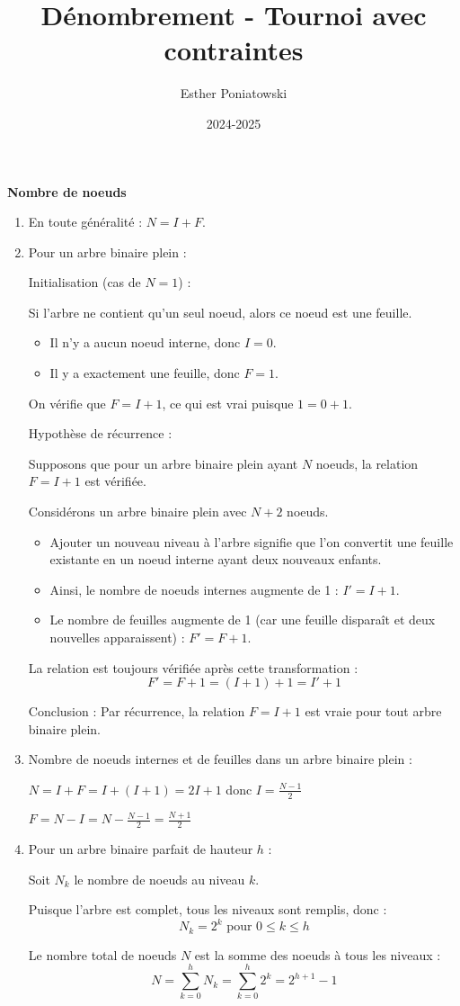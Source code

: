 \documentclass[10pt,a4paper]{article}
\title{Dénombrement - Tournoi avec contraintes}
\author{Esther Poniatowski}
\date{2024-2025}
\begin{document}
\q \textbf{Nombre de noeuds}

\begin{enumerate}
    \item En toute généralité : \( N = I + F \).

    \item Pour un arbre binaire plein :

    Initialisation (cas de \( N = 1 \)) :

    Si l'arbre ne contient qu'un seul noeud, alors ce noeud
    est une feuille.
    \begin{itemize}
        \item Il n'y a aucun noeud interne, donc \( I = 0 \).
        \item Il y a exactement une feuille, donc \( F = 1 \).
    \end{itemize}
    On vérifie que \( F = I + 1 \), ce qui est vrai puisque \( 1 = 0 + 1 \).

    Hypothèse de récurrence :

    Supposons que pour un arbre binaire plein ayant \( N \) noeuds, la relation \( F = I + 1 \) est
    vérifiée.

    Considérons un arbre binaire plein avec \( N+2 \) noeuds.
    \begin{itemize}
        \item Ajouter un nouveau niveau à l'arbre signifie que l'on convertit une feuille existante
        en un noeud interne ayant deux nouveaux enfants.
        \item Ainsi, le nombre de noeuds internes augmente de 1 : \( I' = I + 1 \).
        \item Le nombre de feuilles augmente de 1 (car une feuille disparaît et deux nouvelles
        apparaissent) : \( F' = F + 1 \).
    \end{itemize}
    La relation est toujours vérifiée après cette transformation :
    \[
    F' = F + 1 = (I + 1) + 1 = I' + 1
    \]

    Conclusion : Par récurrence, la relation \( F = I + 1 \) est vraie pour tout arbre binaire
    plein.

    \item Nombre de noeuds internes et de feuilles dans un arbre binaire plein :

    $ N = I + F = I + (I + 1) = 2I + 1 $ donc $ I = \frac{N - 1}{2} $

    $ F = N - I = N - \frac{N - 1}{2} = \frac{N + 1}{2} $

    \item Pour un arbre binaire parfait de hauteur \(h\) :

    Soit \(N_k\) le nombre de noeuds au niveau \(k\).

    Puisque l'arbre est complet, tous les niveaux sont remplis, donc :
    \[ N_k = 2^k \text{ pour } 0 \leq k \leq h \]

    Le nombre total de noeuds \(N\) est la somme des noeuds à tous les niveaux :
    \[ N = \sum_{k=0}^h N_k = \sum_{k=0}^h 2^k = 2^{h+1} - 1 \]

\end{enumerate}
\end{document}
